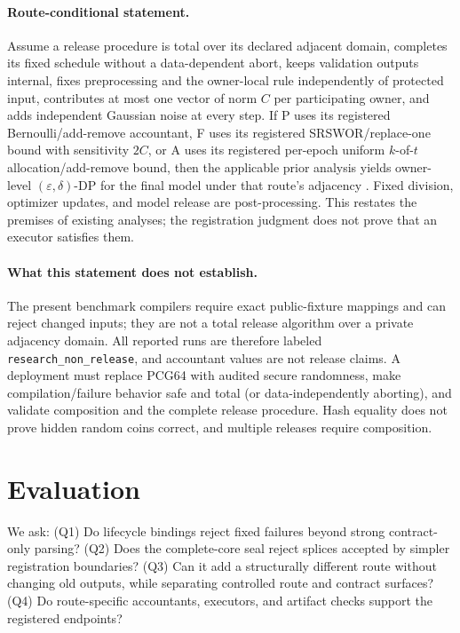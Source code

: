 \documentclass[letterpaper]{article}
\begin{document}
\paragraph{Route-conditional statement.}
Assume a release procedure is total over its declared adjacent domain,
completes its fixed schedule without a data-dependent abort, keeps validation
outputs internal, fixes preprocessing and the owner-local rule independently
of protected input, contributes at most one vector of norm $C$ per
participating owner, and adds independent Gaussian noise at every step.  If P
uses its registered Bernoulli/add-remove accountant, F uses its registered
SRSWOR/replace-one bound with sensitivity $2C$, or A uses its registered
per-epoch uniform $k$-of-$t$ allocation/add-remove bound, then the applicable prior
analysis yields owner-level $(\varepsilon,\delta)$-DP for the final model under
that route's adjacency
\citep{wang2019subsampled,shenfeld2025randomallocation,
dong2026lessrandom}.  Fixed division, optimizer updates, and model release are
post-processing.  This restates the premises of existing analyses; the
registration judgment does not prove that an executor satisfies them.

\paragraph{What this statement does not establish.}
The present benchmark compilers require exact public-fixture mappings and can
reject changed inputs; they are not a total release algorithm over a private
adjacency domain.  All reported runs are therefore labeled
\texttt{research\_non\_release}, and accountant values are not release claims.
A deployment must replace PCG64 with audited secure randomness, make
compilation/failure behavior safe and total (or data-independently aborting),
and validate composition and the complete release procedure.  Hash equality
does not prove hidden random coins correct, and multiple releases require
composition.

\section{Evaluation}
\label{sec:evaluation}

We ask: (Q1) Do lifecycle bindings reject fixed failures beyond strong
contract-only parsing? (Q2) Does the complete-core seal reject splices accepted
by simpler registration boundaries? (Q3) Can it add a structurally different
route without changing old outputs, while separating controlled route and
contract surfaces? (Q4) Do route-specific accountants, executors, and artifact
checks support the registered endpoints?
\end{document}
